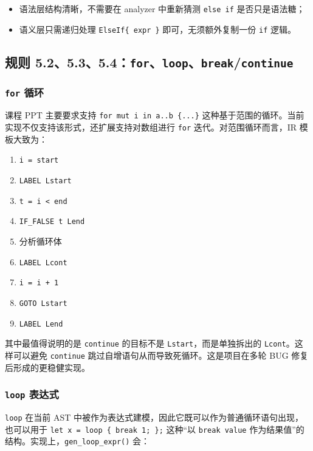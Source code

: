 \documentclass[UTF8,a4paper,12pt]{ctexart}
\newcommand{\pkg}[1]{\texttt{#1}}
\newcommand{\op}[1]{\texttt{#1}}
\begin{document}
\begin{itemize}
    \item 语法层结构清晰，不需要在 analyzer 中重新猜测 \pkg{else if} 是否只是语法糖；
    \item 语义层只需递归处理 \pkg{ElseIf\{ expr \}} 即可，无须额外复制一份 \pkg{if} 逻辑。
\end{itemize}

\subsection{规则 5.2、5.3、5.4：\pkg{for}、\pkg{loop}、\pkg{break}/\pkg{continue}}

\subsubsection{\pkg{for} 循环}

课程 PPT 主要要求支持 \pkg{for mut i in a..b \{...\}} 这种基于范围的循环。当前实现不仅支持该形式，还扩展支持对数组进行 \pkg{for} 迭代。对范围循环而言，IR 模板大致为：

\begin{enumerate}[label=\arabic*.]
    \item \pkg{i = start}
    \item \op{LABEL Lstart}
    \item \pkg{t = i < end}
    \item \op{IF\_FALSE t Lend}
    \item 分析循环体
    \item \op{LABEL Lcont}
    \item \pkg{i = i + 1}
    \item \op{GOTO Lstart}
    \item \op{LABEL Lend}
\end{enumerate}

其中最值得说明的是 \pkg{continue} 的目标不是 \pkg{Lstart}，而是单独拆出的 \pkg{Lcont}。这样可以避免 \pkg{continue} 跳过自增语句从而导致死循环。这是项目在多轮 BUG 修复后形成的更稳健实现。

\subsubsection{\pkg{loop} 表达式}

\pkg{loop} 在当前 AST 中被作为表达式建模，因此它既可以作为普通循环语句出现，也可以用于 \pkg{let x = loop \{ break 1; \};} 这种“以 \pkg{break value} 作为结果值”的结构。实现上，\pkg{gen\_loop\_expr()} 会：
\end{document}
